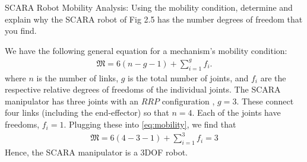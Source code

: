 \noindent 
\begin{homework}{SCARA Robot Mobility Analysis:}
	\newline 
Using the mobility condition, determine and explain why the SCARA robot of Fig 2.5 has the number degrees of freedom that you find.
\end{homework}

\begin{solution}
	We have the following general equation for a mechanism's mobility condition:
	\begin{align}
	\mathfrak{M} = 6(n - g - 1) + \sum_{i=1}^{g} f_i.
	\label{eq:mobility}
	\end{align}
	where $n$ is the number of links, $g$ is the total number of joints, and $f_i$  are the respective relative degrees of freedoms of the individual joints. The SCARA manipulator has three joints with an $RRP$ configuration \ie, $g=3$. These connect four links (including the end-effector) so that $n = 4$. Each of the joints have freedoms, $f_i=1$. Plugging these into \eqref{eq:mobility}, we find that
	\begin{align}
	\mathfrak{M} = 6(4-3-1) + \sum_{i=1}^3 f_i = 3
	\end{align}
	Hence, the SCARA manipulator is a 3DOF robot.
\end{solution}

